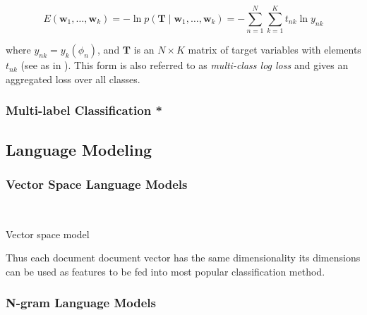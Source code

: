 \begin{equation}
  E(\mathbf{w}_1, \ldots, \mathbf{w}_k) = -\ln p(\mathbf{T} \mid \mathbf{w}_1, \ldots, \mathbf{w}_k) = - \sum_{n=1}^N \sum_{k=1}^K t_{nk} \ln y_{nk}
\end{equation}

where $y_{nk} = y_k (\phi_n)$, and $\mathbf{T}$ is an  $N \times K$ matrix of target variables with elements $t_{nk}$ (see as in \cite[Chapter 4.3.4, p.~209 ]{Bishop:2006aa}). This form is also referred to as \emph{multi-class log loss} and gives an aggregated loss over all classes. 

\subsubsection{Multi-label Classification *}
\label{subs:Multi-label Classification}




\subsection{Language Modeling}

\subsubsection{Vector Space Language Models}



~\cite[Chapter 14, p.~289]{Manning:2008aa}

Vector space model \cite[Chapter 6.3, p.~120]{Manning:2008aa}

\cite[Chapter 6.2, p.~117]{Manning:2008aa}

Thus each document document vector has the same dimensionality its dimensions can be used as features to be fed into most popular classification method.

\subsubsection{N-gram Language Models}
\label{subs:n-gram-language-models}

